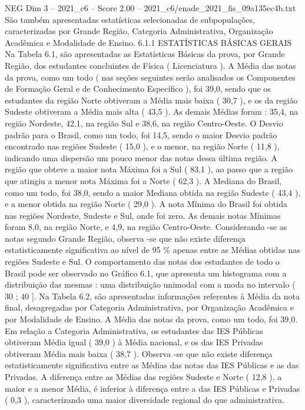 \begin{textsample}{NEG Dim 3 – 2021\_c6 – Score 2.00 – 2021\_c6/enade\_2021\_fis\_09a135ec4b.txt}
São também apresentadas estatísticas selecionadas de subpopulações, caracterizadas por Grande Região, Categoria Administrativa, Organização Acadêmica e Modalidade de Ensino. 6.1.1 ESTATÍSTICAS BÁSICAS GERAIS Na Tabela 6.1, são apresentadas as Estatísticas Básicas da prova, por Grande Região, dos estudantes concluintes de Física ( Licenciatura ).
A Média das notas da prova, como um todo ( nas seções seguintes serão analisados os Componentes de Formação Geral e de Conhecimento Específico ), foi 39,0, sendo que os estudantes da região Norte obtiveram a Média mais baixa ( 30,7 ), e os da região Sudeste obtiveram a Média mais alta ( 43,5 ).
As demais Médias foram : 35,4, na região Nordeste, 42,1, na região Sul e 38,6, na região Centro-Oeste.
O Desvio padrão para o Brasil, como um todo, foi 14,5, sendo o maior Desvio padrão encontrado nas regiões Sudeste ( 15,0 ), e o menor, na região Norte ( 11,8 ), indicando uma dispersão um pouco menor das notas dessa última região.
A região que obteve a maior nota Máxima foi a Sul ( 83,1 ), ao passo que a região que atingiu a menor nota Máxima foi a Norte ( 62,3 ).
A Mediana do Brasil, como um todo, foi 38,0, sendo a maior Mediana obtida na região Sudeste ( 43,4 ), e a menor obtida na região Norte ( 29,0 ).
A nota Mínima do Brasil foi obtida nas regiões Nordeste, Sudeste e Sul, onde foi zero.
As demais notas Mínimas foram 8,0, na região Norte, e 4,9, na região Centro-Oeste.
Considerando -se as notas segundo Grande Região, observa -se que não existe diferença estatisticamente significativa ao nível de 95 \% apenas entre as Médias obtidas nas regiões Sudeste e Sul.
O comportamento das notas dos estudantes de todo o Brasil pode ser observado no Gráfico 6.1, que apresenta um histograma com a distribuição das mesmas : uma distribuição unimodal com a moda no intervalo ( 30 ; 40 ].
Na Tabela 6.2, são apresentadas informações referentes à Média da nota final, desagregadas por Categoria Administrativa, por Organização Acadêmica e por Modalidade de Ensino.
A Média das notas da prova, como um todo, foi 39,0.
Em relação a Categoria Administrativa, os estudantes das IES Públicas obtiveram Média igual ( 39,0 ) à Média nacional, e os das IES Privadas obtiveram Média mais baixa ( 38,7 ).
Observa -se que não existe diferença estatisticamente significativa entre as Médias das notas das IES Públicas e as das Privadas.
A diferença entre as Médias das regiões Sudeste e Norte ( 12,8 ), a maior e a menor Média, é inferior à diferença entre a das IES Públicas e Privadas ( 0,3 ), caracterizando uma maior diversidade regional do que administrativa.

\end{textsample}
